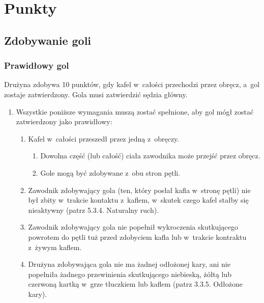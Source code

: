 \documentclass[12pt]{article}
\begin{document}
\pagebreak
\section{Punkty}

\subsection{Zdobywanie goli}

\subsubsection{Prawidłowy gol}
Drużyna zdobywa 10 punktów, gdy kafel w~całości przechodzi przez obręcz, a~gol zostaje zatwierdzony. Gola musi
zatwierdzić sędzia główny.

\begin{enumerate}
	\item
	      Wszystkie poniższe wymagania muszą zostać spełnione, aby gol mógł
	      zostać zatwierdzony jako prawidłowy:

	      \begin{enumerate}
		      \item
		            Kafel w~całości przeszedł przez jedną z~obręczy.

		            \begin{enumerate}
			            \item
			                  Dowolna część (lub całość) ciała zawodnika może przejść przez
			                  obręcz.
			            \item
			                  Gole mogą być zdobywane z~obu stron pętli.
		            \end{enumerate}
		      \item
		            Zawodnik zdobywający gola (ten, który posłał kafla w~stronę pętli)
		            nie był zbity w~trakcie kontaktu z~kaflem, w~skutek czego kafel
		            stałby się nieaktywny (patrz 5.3.4. Naturalny ruch).
		      \item
		            Zawodnik zdobywający gola nie popełnił wykroczenia skutkującego
		            powrotem do pętli tuż przed zdobyciem kafla lub w~trakcie kontraktu
		            z~żywym kaflem.
		      \item
		            Drużyna zdobywająca gola nie ma żadnej odłożonej kary, ani nie
		            popełniła żadnego przewinienia skutkującego niebieską, żółtą lub
		            czerwoną kartką w~grze tłuczkiem lub kaflem (patrz 3.3.5. Odłożone
		            kary).


\end{enumerate}
\end{enumerate}
\end{document}

